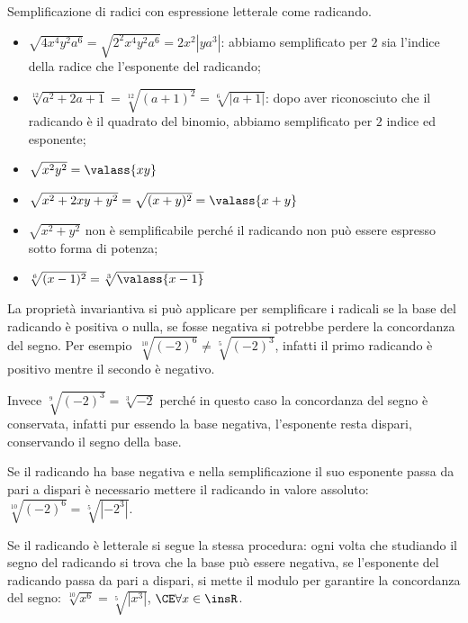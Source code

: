 \begin{exrig}
 \begin{esempio}
Semplificazione di radici con espressione letterale come radicando.
\begin{itemize}
\item \(\sqrt{4x^4y^2a^6}=\sqrt{2^2x^4y^2a^6}=2x^2\left|ya^3\right|\): 
 abbiamo semplificato per \(2\) sia l'indice della radice che l'esponente del 
 radicando;
\item \(\sqrt[12]{a^2+2a+1}=\sqrt[12]{(a+1)^2}=\sqrt[6]{\left|a+1\right|}\): 
 dopo aver riconosciuto che il radicando è il quadrato del binomio, 
 abbiamo semplificato per \(2\) indice ed esponente;
\item \(\sqrt{x^2y^2}=\valass{xy}\)
\item \(\sqrt{x^2+2xy+y^2}=\sqrt{(x+y)^2}=\valass{x+y}\)
\item \(\sqrt{x^2+y^2}\) non è semplificabile perché il radicando non può essere 
 espresso sotto forma di potenza;
\item \(\sqrt[6]{(x-1)^2}=\sqrt[3]{\valass{x-1}}\)
\end{itemize}
 \end{esempio}
\end{exrig}

La proprietà invariantiva si può applicare per semplificare i radicali se la 
base del radicando è positiva o nulla, se fosse negativa si potrebbe perdere 
la concordanza del segno. 
Per esempio~\(\sqrt[10]{(-2)^6}\neq \sqrt[5]{(-2)^3}\), infatti il primo 
radicando è positivo mentre il secondo è negativo.

Invece \(\sqrt[9]{(-2)^3}=\sqrt[3]{-2}\) perché in questo caso la concordanza 
del segno è conservata, infatti pur essendo la base negativa, l'esponente 
resta dispari, conservando il segno della base.

Se il radicando ha base negativa e nella semplificazione il suo esponente 
passa da pari a dispari è necessario mettere il radicando in valore assoluto: 
\(\sqrt[10]{(-2)^6}=\sqrt[5]{\left|-2^3\right|}\).

Se il radicando è letterale si segue la stessa procedura: ogni volta che 
studiando il segno del radicando si trova che la base può essere negativa, 
se l'esponente del radicando passa da pari a dispari, si mette il modulo per 
garantire la concordanza del segno:
\(\sqrt[10]{x^6}=\sqrt[5]{\left|x^3\right|}\), \(\CE \forall x \in \insR\).


